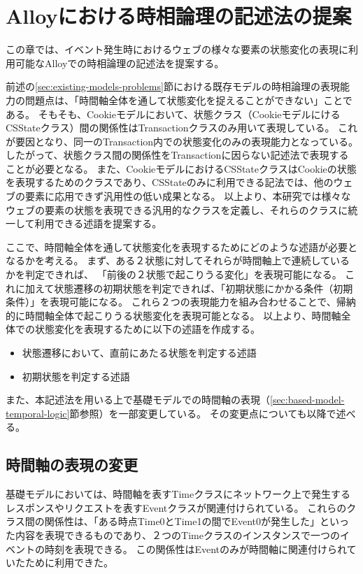 \documentclass[12pt,a4paper]{jbook}
\begin{document}
\newpage

\chapter{Alloyにおける時相論理の記述法の提案}
\label{sec:ProposedModel-TemporalLogic}
この章では、イベント発生時におけるウェブの様々な要素の状態変化の表現に利用可能なAlloyでの時相論理の記述法を提案する。

前述の\ref{sec:existing-models-problems}節における既存モデルの時相論理の表現能力の問題点は、「時間軸全体を通して状態変化を捉えることができない」ことである。
そもそも、Cookieモデルにおいて、状態クラス（CookieモデルにけるCSStateクラス）間の関係性はTransactionクラスのみ用いて表現している。
これが要因となり、同一のTransaction内での状態変化のみの表現能力となっている。
したがって、状態クラス間の関係性をTransactionに因らない記述法で表現することが必要となる。
また、CookieモデルにおけるCSStateクラスはCookieの状態を表現するためのクラスであり、CSStateのみに利用できる記法では、他のウェブの要素に応用できず汎用性の低い成果となる。
以上より、本研究では様々なウェブの要素の状態を表現できる汎用的なクラスを定義し、それらのクラスに統一して利用できる述語を提案する。

ここで、時間軸全体を通して状態変化を表現するためにどのような述語が必要となるかを考える。
まず、ある２状態に対してそれらが時間軸上で連続しているかを判定できれば、
「前後の２状態で起こりうる変化」を表現可能になる。
これに加えて状態遷移の初期状態を判定できれば、「初期状態にかかる条件（初期条件）」を表現可能になる。
これら２つの表現能力を組み合わせることで、帰納的に時間軸全体で起こりうる状態変化を表現可能となる。
以上より、時間軸全体での状態変化を表現するために以下の述語を作成する。
\begin{itemize}
\item 状態遷移において、直前にあたる状態を判定する述語
\item 初期状態を判定する述語
\end{itemize}

また、本記述法を用いる上で基礎モデルでの時間軸の表現（\ref{sec:based-model-temporal-logic}節参照）を一部変更している。
その変更点についても以降で述べる。

\section{時間軸の表現の変更}
基礎モデル\cite{based-model}においては、時間軸を表すTimeクラスにネットワーク上で発生するレスポンスやリクエストを表すEventクラスが関連付けられている。
これらのクラス間の関係性は、「ある時点Time0とTime1の間でEvent0が発生した」といった内容を表現できるものであり、２つのTimeクラスのインスタンスで一つのイベントの時刻を表現できる。
この関係性はEventのみが時間軸に関連付けられていたために利用できた。
\end{document}

